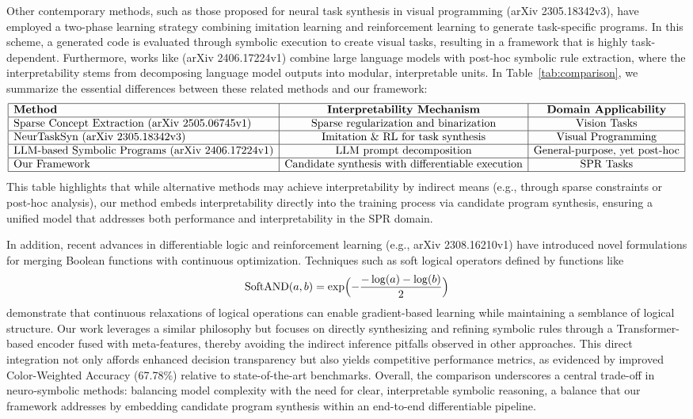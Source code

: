 \documentclass[11pt]{article}
\begin{document}
Other contemporary methods, such as those proposed for neural task synthesis in visual programming (arXiv 2305.18342v3), have employed a two-phase learning strategy combining imitation learning and reinforcement learning to generate task-specific programs. In this scheme, a generated code is evaluated through symbolic execution to create visual tasks, resulting in a framework that is highly task-dependent. Furthermore, works like (arXiv 2406.17224v1) combine large language models with post-hoc symbolic rule extraction, where the interpretability stems from decomposing language model outputs into modular, interpretable units. In Table~\ref{tab:comparison}, we summarize the essential differences between these related methods and our framework:
\[
\begin{array}{|l|c|c|}
\hline
\textbf{Method} & \textbf{Interpretability Mechanism} & \textbf{Domain Applicability} \\
\hline
\text{Sparse Concept Extraction (arXiv 2505.06745v1)} & \text{Sparse regularization and binarization} & \text{Vision Tasks} \\
\hline
\text{NeurTaskSyn (arXiv 2305.18342v3)} & \text{Imitation \& RL for task synthesis} & \text{Visual Programming} \\
\hline
\text{LLM-based Symbolic Programs (arXiv 2406.17224v1)} & \text{LLM prompt decomposition} & \text{General-purpose, yet post-hoc} \\
\hline
\text{Our Framework} & \text{Candidate synthesis with differentiable execution} & \text{SPR Tasks} \\
\hline
\end{array}
\]
This table highlights that while alternative methods may achieve interpretability by indirect means (e.g., through sparse constraints or post-hoc analysis), our method embeds interpretability directly into the training process via candidate program synthesis, ensuring a unified model that addresses both performance and interpretability in the SPR domain.

In addition, recent advances in differentiable logic and reinforcement learning (e.g., arXiv 2308.16210v1) have introduced novel formulations for merging Boolean functions with continuous optimization. Techniques such as soft logical operators defined by functions like
\[
\text{SoftAND}(a,b) = \exp\Bigl(-\frac{-\log(a)-\log(b)}{2}\Bigr)
\]
demonstrate that continuous relaxations of logical operations can enable gradient-based learning while maintaining a semblance of logical structure. Our work leverages a similar philosophy but focuses on directly synthesizing and refining symbolic rules through a Transformer-based encoder fused with meta-features, thereby avoiding the indirect inference pitfalls observed in other approaches. This direct integration not only affords enhanced decision transparency but also yields competitive performance metrics, as evidenced by improved Color-Weighted Accuracy (67.78\%) relative to state-of-the-art benchmarks. Overall, the comparison underscores a central trade-off in neuro‐symbolic methods: balancing model complexity with the need for clear, interpretable symbolic reasoning, a balance that our framework addresses by embedding candidate program synthesis within an end-to-end differentiable pipeline.
\end{document}
